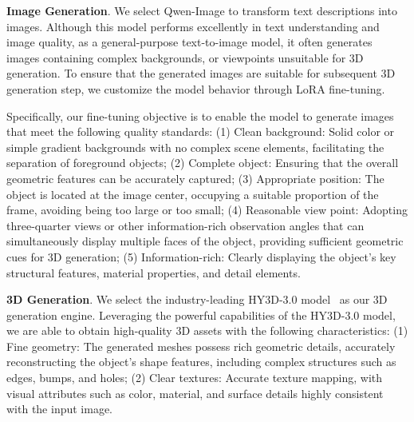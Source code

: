 \documentclass{article} %
\begin{document}

\textbf{Image Generation}. We select Qwen-Image to transform text descriptions into images. Although this model performs excellently in text understanding and image quality, as a general-purpose text-to-image model, it often generates images containing complex backgrounds, or viewpoints unsuitable for 3D generation. To ensure that the generated images are suitable for subsequent 3D generation step, we customize the model behavior through LoRA fine-tuning.

Specifically, our fine-tuning objective is to enable the model to generate images that meet the following quality standards: (1) Clean background: Solid color or simple gradient backgrounds with no complex scene elements, facilitating the separation of foreground objects; (2) Complete object: Ensuring that the overall geometric features can be accurately captured; (3) Appropriate position: The object is located at the image center, occupying a suitable proportion of the frame, avoiding being too large or too small; (4) Reasonable view point: Adopting three-quarter views or other information-rich observation angles that can simultaneously display multiple faces of the object, providing sufficient geometric cues for 3D generation; (5) Information-rich: Clearly displaying the object's key structural features, material properties, and detail elements.


\textbf{3D Generation}. We select the industry-leading HY3D-3.0 model~\cite{hunyuan3d_online} as our 3D generation engine. Leveraging the powerful capabilities of the HY3D-3.0 model, we are able to obtain high-quality 3D assets with the following characteristics: (1) Fine geometry: The generated meshes possess rich geometric details, accurately reconstructing the object's shape features, including complex structures such as edges, bumps, and holes; (2) Clear textures: Accurate texture mapping, with visual attributes such as color, material, and surface details highly consistent with the input image.
\end{document}
